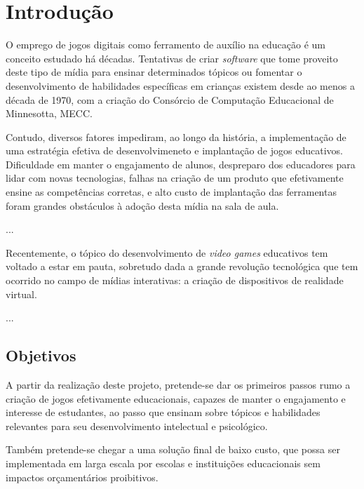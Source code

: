 \chapter{Introdução}

O emprego de jogos digitais como ferramento de auxílio na educação é um conceito estudado há décadas. Tentativas de criar \textit{software} que tome proveito deste tipo de mídia para ensinar determinados tópicos ou fomentar o desenvolvimento de habilidades específicas em crianças existem desde ao menos a década de 1970, com a criação do Consórcio de Computação Educacional de Minnesotta, MECC.

Contudo, diversos fatores impediram, ao longo da história, a implementação de uma estratégia efetiva de desenvolvimeneto e implantação de jogos educativos. Dificuldade em manter o engajamento de alunos, despreparo dos educadores para lidar com novas tecnologias, falhas na criação de um produto que efetivamente ensine as competências corretas, e alto custo de implantação das ferramentas foram grandes obstáculos à adoção desta mídia na sala de aula.

...

Recentemente, o tópico do desenvolvimento de \textit{video games} educativos tem voltado a estar em pauta, sobretudo dada a grande revolução tecnológica que tem ocorrido no campo de mídias interativas: a criação de dispositivos de realidade virtual.

...

\section{Objetivos}\label{sec-objetivos}

A partir da realização deste projeto, pretende-se dar os primeiros passos rumo a criação de jogos efetivamente educacionais, capazes de manter o engajamento e interesse de estudantes, ao passo que ensinam sobre tópicos e habilidades relevantes para seu desenvolvimento intelectual e psicológico.

Também pretende-se chegar a uma solução final de baixo custo, que possa ser implementada em larga escala por escolas e instituições educacionais sem impactos orçamentários proibitivos.

